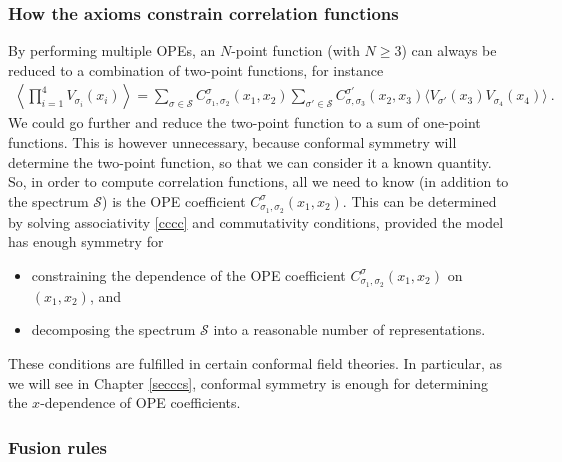 \documentclass[12pt, a4paper, notitlepage, twoside]{report}
\numberwithin{equation}{section}
\theoremstyle{break}
\begin{document}
\subsubsection{How the axioms constrain correlation functions}

By performing multiple OPEs, an $N$-point function (with $N\geq 3$) can always be reduced to a combination of two-point functions, for instance
\begin{align}
 \left\langle \prod_{i=1}^4 V_{\sigma_i}(x_i) \right\rangle = \sum_{\sigma\in \mathcal{S}} C_{\sigma_1,\sigma_2}^{\sigma}(x_1,x_2)\sum_{\sigma'\in \mathcal{S}} C_{\sigma,\sigma_3}^{\sigma'}(x_2,x_3)\Big\langle V_{\sigma'}(x_3)V_{\sigma_4}(x_4)\Big\rangle\ .
\end{align}
We could go further and reduce the two-point function to a sum of one-point functions.
This is however unnecessary, because conformal symmetry will determine the two-point function, so that we can consider it a known quantity.
So, in order to compute correlation functions, all we need to know (in addition to the spectrum $\mathcal{S}$) is the OPE coefficient $C_{\sigma_1,\sigma_2}^{\sigma}(x_1,x_2)$.
This can be determined by solving associativity \eqref{cccc} and commutativity conditions, provided the model has enough symmetry for 
\begin{itemize}
 \item constraining the dependence of the OPE coefficient $C_{\sigma_1,\sigma_2}^{\sigma}(x_1,x_2)$ on $(x_1,x_2)$, and
\item decomposing the spectrum $\mathcal{S}$ into a reasonable number of representations.
\end{itemize}
These conditions are fulfilled in certain conformal field theories.
In particular, as we will see in Chapter \ref{secccs}, conformal symmetry is enough for determining the $x$-dependence of OPE coefficients. 

\subsubsection{Fusion rules}
\end{document}
